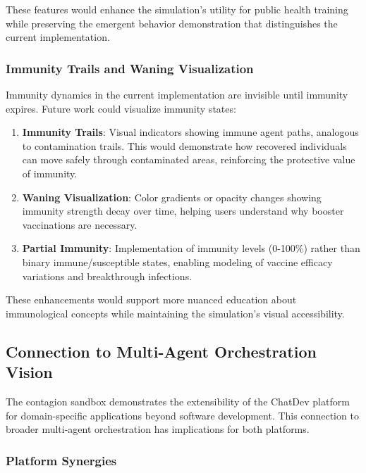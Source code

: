 These features would enhance the simulation's utility for public health training while preserving the emergent behavior demonstration that distinguishes the current implementation.

\subsubsection{Immunity Trails and Waning Visualization}

Immunity dynamics in the current implementation are invisible until immunity expires. Future work could visualize immunity states:

\begin{enumerate}
    \item \textbf{Immunity Trails}: Visual indicators showing immune agent paths, analogous to contamination trails. This would demonstrate how recovered individuals can move safely through contaminated areas, reinforcing the protective value of immunity.
    
    \item \textbf{Waning Visualization}: Color gradients or opacity changes showing immunity strength decay over time, helping users understand why booster vaccinations are necessary.
    
    \item \textbf{Partial Immunity}: Implementation of immunity levels (0-100\%) rather than binary immune/susceptible states, enabling modeling of vaccine efficacy variations and breakthrough infections.
\end{enumerate}

These enhancements would support more nuanced education about immunological concepts while maintaining the simulation's visual accessibility.

\subsection{Connection to Multi-Agent Orchestration Vision}

The contagion sandbox demonstrates the extensibility of the ChatDev platform for domain-specific applications beyond software development. This connection to broader multi-agent orchestration has implications for both platforms.

\subsubsection{Platform Synergies}


